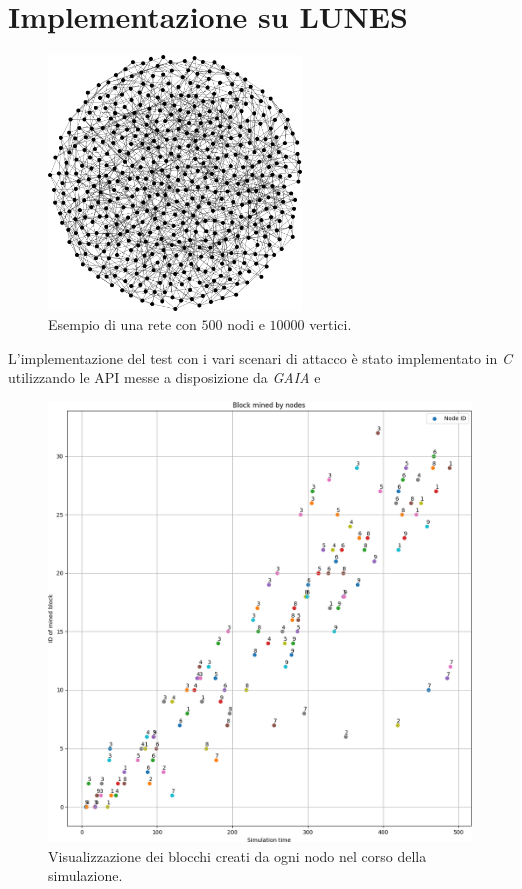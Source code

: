 \chapter{Implementazione su LUNES}

\begin{figure}
    \centering
    \includegraphics[width=0.6\textwidth]{images/network-500.png}
    \caption{Esempio di una rete con $500$ nodi e $10000$ vertici.}
\end{figure}
L'implementazione del test con i vari scenari di attacco è stato implementato in \textit{C} utilizzando le API messe a disposizione da \textit{GAIA} e 

\begin{figure}
    \centering
    \includegraphics[width=\textwidth]{images/blockmined.png}
    \caption{Visualizzazione dei blocchi creati da ogni nodo nel corso della simulazione.}
\end{figure}

